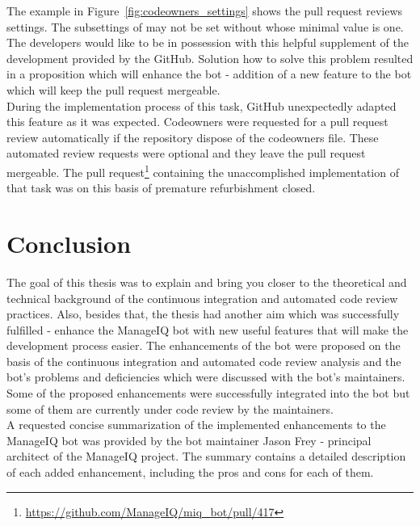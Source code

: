 The example in Figure~\ref{fig:codeowners_settings} shows the pull request reviews settings. The subsettings of  may not be set without  whose minimal value is one. The developers would like to be in possession with this helpful supplement of the development provided by the GitHub. Solution how to solve this problem resulted in a proposition which will enhance the bot - addition of a new feature to the bot which will keep the pull request mergeable.\\

During the implementation process of this task, GitHub unexpectedly adapted this feature as it was expected. Codeowners were requested for a pull request review automatically if the repository dispose of the codeowners file. These automated review requests were optional and they leave the pull request mergeable. The pull request\footnote{\url{https://github.com/ManageIQ/miq_bot/pull/417}} containing the unaccomplished implementation of that task was on this basis of premature refurbishment closed.

\chapter{Conclusion}

The goal of this thesis was to explain and bring you closer to the theoretical and technical background of the continuous integration and automated code review practices. Also, besides that, the thesis had another aim which was successfully fulfilled - enhance the ManageIQ bot with new useful features that will make the development process easier. The enhancements of the bot were proposed on the basis of the continuous integration and automated code review analysis and the bot's problems and deficiencies which were discussed with the bot's maintainers. Some of the proposed enhancements were successfully integrated into the bot but some of them are currently under code review by the maintainers.\\

A requested concise summarization of the implemented enhancements to the ManageIQ bot was provided by the bot maintainer Jason Frey - principal architect of the ManageIQ project. The summary contains a detailed description of each added enhancement, including the pros and cons for each of them.

